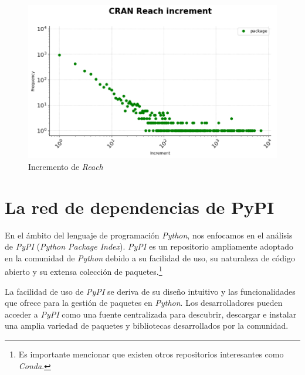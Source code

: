 \begin{figure}[h!]
    \begin{center}
        \includegraphics[width=1\textwidth]{img/cran/reach_increment.png}
        \caption{Incremento de \textit{Reach}}
        \label{fig:Incremento de Reach}
    \end{center}
\end{figure}
































\section{La red de dependencias de PyPI}

En el ámbito del lenguaje de programación \textit{Python}, nos enfocamos en el análisis de \textit{PyPI}
(\textit{Python Package Index}). \textit{PyPI} es un repositorio ampliamente adoptado en la comunidad de
\textit{Python} debido a su facilidad de uso, su naturaleza de código abierto y su extensa colección de
paquetes.\footnote{Es importante mencionar que existen otros repositorios interesantes como \textit{Conda}.}

La facilidad de uso de \textit{PyPI} se deriva de su diseño intuitivo y las funcionalidades que ofrece
para la gestión de paquetes en \textit{Python}. Los desarrolladores pueden acceder a \textit{PyPI} como
una fuente centralizada para descubrir, descargar e instalar una amplia variedad de paquetes y bibliotecas
desarrollados por la comunidad.

